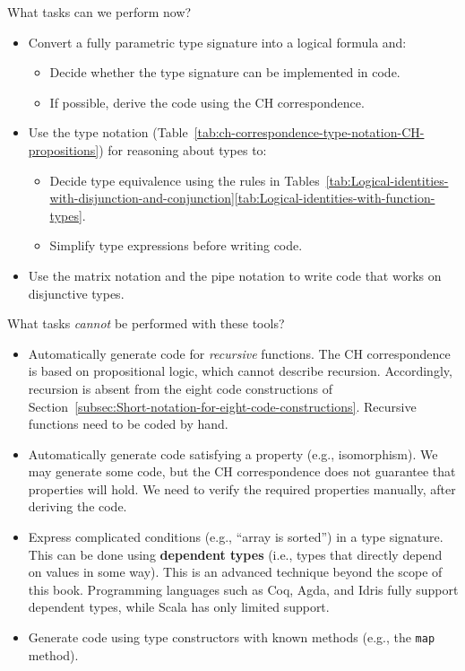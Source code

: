 What tasks can we perform now?
\begin{itemize}
\item Convert a fully parametric type signature into a logical formula and:
\begin{itemize}
\item Decide whether the type signature can be implemented in code.
\item If possible, derive the code using the CH correspondence.
\end{itemize}
\item Use the type notation (Table~\ref{tab:ch-correspondence-type-notation-CH-propositions})
for reasoning about types to:
\begin{itemize}
\item Decide type equivalence using the rules in Tables~\ref{tab:Logical-identities-with-disjunction-and-conjunction}\textendash \ref{tab:Logical-identities-with-function-types}.
\item Simplify type expressions before writing code.
\end{itemize}
\item Use the matrix notation and the pipe notation to write code that works
on disjunctive types.
\end{itemize}
What tasks \emph{cannot} be performed with these tools?
\begin{itemize}
\item Automatically generate code for \emph{recursive} functions. The CH
correspondence is based on propositional logic, which cannot describe
recursion. Accordingly, recursion is absent from the eight code constructions
of Section~\ref{subsec:Short-notation-for-eight-code-constructions}.
Recursive functions need to be coded by hand.
\item Automatically generate code satisfying a property (e.g., isomorphism).
We may generate some code, but the CH correspondence does not guarantee
that properties will hold. We need to verify the required properties
manually, after deriving the code.
\item Express complicated conditions (e.g., \textsf{``}array is sorted\textsf{''}) in a
type signature. This can be done using \textbf{dependent types}
(i.e., types that directly depend on values in some way). This is
an advanced technique beyond the scope of this book. Programming languages
such as Coq, Agda, and Idris fully support dependent types, while
Scala has only limited support.
\item Generate code using type constructors with known methods (e.g., the
\lstinline!map! method).
\end{itemize}
